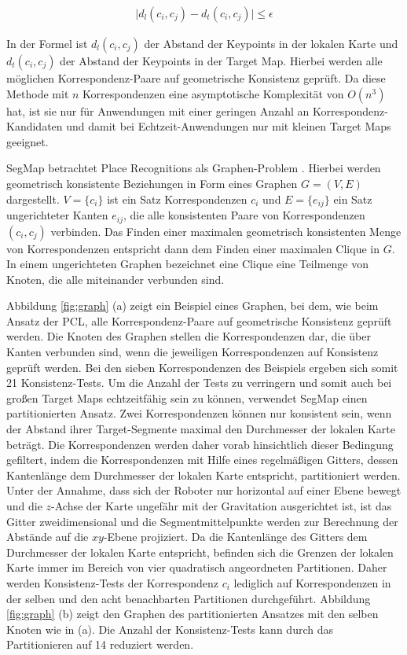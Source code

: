\begin{align}
	\label{euklAbstand}
	\vert d_l(c_i,c_j) - d_t(c_i,c_j)\vert \leq \epsilon
\end{align}

In der Formel ist $ d_l(c_i,c_j) $ der Abstand der Keypoints in der lokalen Karte und $ d_t(c_i,c_j) $ der Abstand der Keypoints in der Target Map. Hierbei werden alle möglichen Korrespondenz-Paare auf geometrische Konsistenz geprüft. Da diese Methode mit $ n $ Korrespondenzen eine asymptotische Komplexität von $ O(n^3) $ hat, ist sie nur für Anwendungen mit einer geringen Anzahl an Korrespondenz-Kandidaten und damit bei Echtzeit-Anwendungen nur mit kleinen Target Maps geeignet.

SegMap betrachtet Place Recognitions als Graphen-Problem \cite{Dube2018}. Hier\-bei werden geometrisch konsistente Beziehungen in Form eines Graphen $ G = (V,E) $ dargestellt. $ V = \{c_i\} $ ist ein Satz Korrespondenzen $ c_i $ und $ E = \{e_{ij}\} $ ein Satz ungerichteter Kanten $ e_{ij} $, die alle konsistenten Paare von Korrespondenzen $(c_i,c_j) $ verbinden. Das Finden einer maximalen geometrisch konsistenten Menge von Korrespondenzen entspricht dann dem Finden einer maximalen Clique in $ G $. In einem ungerichteten Graphen bezeichnet eine Clique eine Teilmenge von Knoten, die alle miteinander verbunden sind. 

Abbildung \ref{fig:graph} (a) zeigt ein Beispiel eines Graphen, bei dem, wie beim Ansatz der PCL, alle Korrespondenz-Paare auf geometrische Konsistenz geprüft werden. Die Knoten des Graphen stellen die Korrespondenzen dar, die über Kanten verbunden sind, wenn die jeweiligen Korrespondenzen auf Konsistenz geprüft werden. Bei den sieben Korrespondenzen des Beispiels ergeben sich somit 21 Konsistenz-Tests. Um die Anzahl der Tests zu verringern und somit auch bei großen Target Maps echtzeitfähig sein zu können, verwendet SegMap einen partitionierten Ansatz. Zwei Korrespondenzen können nur konsistent sein, wenn der Abstand ihrer Target-Segmente maximal den Durch\-mes\-ser der lokalen Karte beträgt. Die Korrespondenzen werden daher vorab hinsichtlich dieser Bedingung gefiltert, indem die Korrespondenzen mit Hilfe eines regelmäßigen Gitters, dessen Kantenlänge dem Durchmesser der lokalen Karte entspricht, partitioniert  werden. Unter der Annahme, dass  sich der Roboter nur horizontal auf einer Ebene bewegt und die $ z $-Achse der Karte ungefähr mit der Gravitation ausgerichtet ist, ist das Gitter  zweidimensional und die Segmentmittelpunkte werden zur Berechnung der Abstände auf die $ xy $-Ebene projiziert. Da die Kantenlänge des Gitters dem Durchmesser der lokalen Karte entspricht, befinden sich die Grenzen der lokalen Karte immer im Bereich von vier quadratisch angeordneten Partitionen. Daher werden Konsistenz-Tests der Korrespondenz $ c_i $ lediglich auf Korrespondenzen in der selben und den acht benachbarten Partitionen durchgeführt. Abbildung \ref{fig:graph} (b) zeigt den Graphen des partitionierten Ansatzes mit den selben Knoten wie in (a). Die Anzahl der Konsistenz-Tests kann durch das Partitionieren auf 14 reduziert werden.

